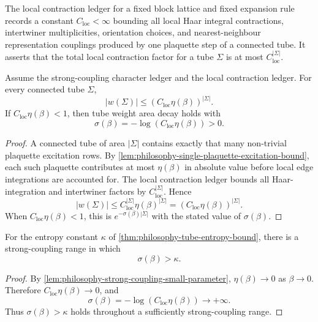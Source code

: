 \begin{definition}
\label{def:philosophy-local-contraction-ledger}
The local contraction ledger for a fixed block lattice and fixed expansion
rule records a constant $C_{\mathrm{loc}}<\infty$ bounding all local Haar
integral contractions, intertwiner multiplicities, orientation choices, and
nearest-neighbour representation couplings produced by one plaquette step
of a connected tube. It asserts that the total local contraction factor for
a tube $\Sigma$ is at most $C_{\mathrm{loc}}^{|\Sigma|}$.
\end{definition}

\begin{theorem}
\label{thm:philosophy-strong-coupling-tube-weight-area-decay}
Assume the strong-coupling character ledger and the local contraction
ledger. For every connected tube $\Sigma$,
$$
|w(\Sigma)|
\le
\left(C_{\mathrm{loc}}\eta(\beta)\right)^{|\Sigma|}.
$$
If $C_{\mathrm{loc}}\eta(\beta)<1$, then tube weight area decay holds with
$$
\sigma(\beta)=
-\log\left(C_{\mathrm{loc}}\eta(\beta)\right)>0.
$$
\end{theorem}
\begin{proof}
A connected tube of area $|\Sigma|$ contains exactly that many non-trivial
plaquette excitation rows. By
\autoref{lem:philosophy-single-plaquette-excitation-bound}, each such
plaquette contributes at most $\eta(\beta)$ in absolute value before local
edge integrations are accounted for. The local contraction ledger bounds
all Haar-integration and intertwiner factors by
$C_{\mathrm{loc}}^{|\Sigma|}$. Hence
$$
|w(\Sigma)|
\le
C_{\mathrm{loc}}^{|\Sigma|}\eta(\beta)^{|\Sigma|}
=
\left(C_{\mathrm{loc}}\eta(\beta)\right)^{|\Sigma|}.
$$
When $C_{\mathrm{loc}}\eta(\beta)<1$, this is
$e^{-\sigma(\beta)|\Sigma|}$ with the stated value of $\sigma(\beta)$.
\end{proof}

\begin{theorem}
\label{thm:philosophy-strong-coupling-dominates-tube-entropy}
For the entropy constant $\kappa$ of
\autoref{thm:philosophy-tube-entropy-bound}, there is a strong-coupling
range in which
$$
\sigma(\beta)>\kappa.
$$
\end{theorem}
\begin{proof}
By \autoref{lem:philosophy-strong-coupling-small-parameter},
$\eta(\beta)\to0$ as $\beta\to0$. Therefore
$C_{\mathrm{loc}}\eta(\beta)\to0$, and
$$
\sigma(\beta)=
-\log\left(C_{\mathrm{loc}}\eta(\beta)\right)
\to+\infty.
$$
Thus $\sigma(\beta)>\kappa$ holds throughout a sufficiently strong-coupling
range.
\end{proof}

